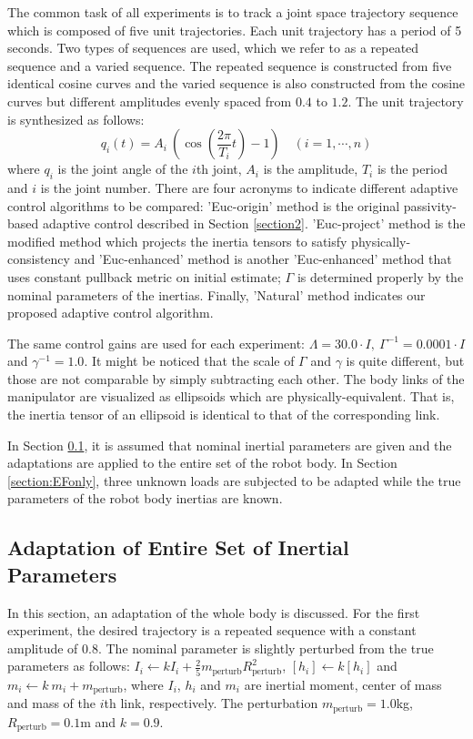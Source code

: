 \documentclass[letterpaper, 10 pt, conference]{ieeeconf}  %
\begin{document}
The common task of all experiments is to track a joint space trajectory sequence which is composed of five unit trajectories. Each unit trajectory has a period of 5 seconds. Two types of sequences are used, which we refer to as a repeated sequence and a varied sequence. The repeated sequence is constructed from five identical cosine curves and the varied sequence is also constructed from the cosine curves but different amplitudes evenly spaced from $0.4$ to $1.2$. The unit trajectory is synthesized as follows:
\begin{equation*}
	q_i(t) = A_i~(\cos(\frac{2\pi}{T_i}t)-1)  \quad (i=1,\cdots,n)
\end{equation*}
where $q_i$ is the joint angle of the $i$th joint, $A_i$ is the amplitude,  $T_i$ is the period and $i$ is the joint number. There are four acronyms to indicate different adaptive control algorithms to be compared: 'Euc-origin' method is the original passivity-based adaptive control described in Section \ref{section2}. 'Euc-project' method is the modified method which projects the inertia tensors to satisfy physically-consistency and 'Euc-enhanced' method is another 'Euc-enhanced' method that uses constant pullback metric on initial estimate; $\Gamma$ is determined properly by the nominal parameters of the inertias. Finally, 'Natural' method indicates our proposed adaptive control algorithm. 

The same control gains are used for each experiment:  $\Lambda = 30.0\cdot I, ~\Gamma^{-1} = 0.0001\cdot I$ and $\gamma^{-1} = 1.0$. It might be noticed that the scale of $\Gamma$ and $\gamma$ is quite different, but those are not comparable by simply subtracting each other. The body links of the manipulator are visualized as ellipsoids which are physically-equivalent. That is, the inertia tensor of an ellipsoid is identical to that of the corresponding link. 

In Section \ref{section:entire}, it is assumed that nominal inertial parameters are given and the adaptations are applied to the entire set of the robot body. In Section \ref{section:EFonly}, three unknown loads are subjected to be adapted while the true parameters of the robot body inertias are known.


\subsection{Adaptation of Entire Set of Inertial Parameters} \label{section:entire}
In this section, an adaptation of the whole body is discussed. For the first experiment, the desired trajectory is a repeated sequence with a constant amplitude of 0.8. The nominal parameter is slightly perturbed from the true parameters as follows: $I_i \leftarrow k I_i + \frac{2}{5}m_{\text{perturb}}R_{\text{perturb}}^2$, $[h_i]\leftarrow k [h_i] $ and $m_i \leftarrow k ~m_i + m_{\text{perturb}}$, where $I_i$, $h_i$ and $m_i$ are inertial moment, center of mass and mass of the $i$th link, respectively. The perturbation $m_{\text{perturb}}=1.0$kg, $R_{\text{perturb}}=0.1$m and $k=0.9$. 
\end{document}
